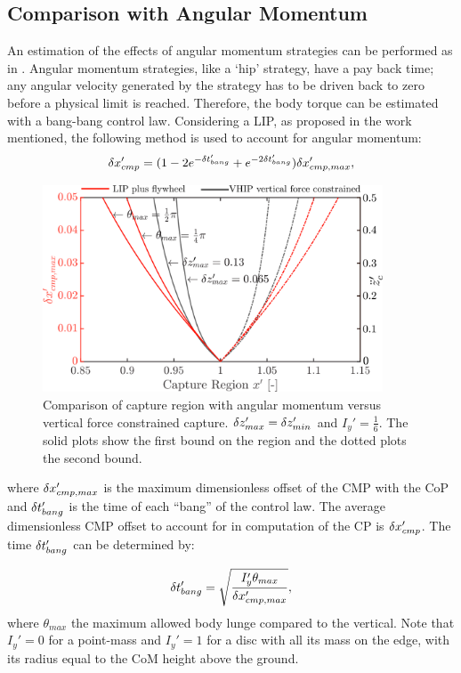 \subsection{Comparison with Angular Momentum}
An estimation of the effects of angular momentum strategies can be performed as in \cite{koolen2012capturability}. Angular momentum strategies, like a `hip' strategy, have a pay back time; any angular velocity generated by the strategy has to be driven back to zero before a physical limit is reached. Therefore, the body torque can be estimated with a bang-bang control law.  Considering a \ac{LIP}, as proposed in the work mentioned, the following method is used to account for angular momentum:
\begin{equation}
\delta x_{cmp}' = (1-2e^{-\delta t_{bang}'}+e^{-2\delta t_{bang}'})\delta x_{cmp,max}',
\end{equation}
\begin{figure}
\centering
\includegraphics[width=0.9\textwidth]{STYLESTUFF/capcompare.png}
\caption{Comparison of capture region with angular momentum versus vertical force constrained capture. $\delta z_{max}' =\delta z_{min}'$ and $I_y' = \frac{1}{6}$. The solid plots show the first bound on the region and the dotted plots the second bound.}
\label{fig:capcompare}
\end{figure}
where $\delta x_{cmp,max}'$ is the maximum dimensionless offset of the \ac{CMP} with the \ac{CoP} and $\delta t_{bang}'$ is the time of each ``bang'' of the control law. The average dimensionless \ac{CMP} offset to account for in computation of the \ac{CP} is $\delta x_{cmp}'$. The time $\delta t_{bang}'$ can be determined by:

\begin{equation}
\delta t_{bang}' = \sqrt{\frac{I_y'\theta_{max}}{\delta x_{cmp,max}'}},
\end{equation}
where $\theta_{max}$ the maximum allowed body lunge compared to the vertical. Note that $I_y'=0$ for a point-mass and $I_y'=1$ for a disc with all its mass on the edge, with its radius equal to the \ac{CoM} height above the ground. 

